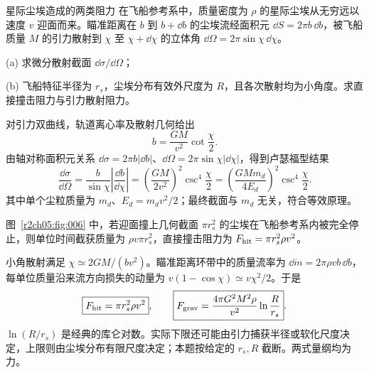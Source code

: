 \begin{practicebox}{星际尘埃造成的两类阻力}
在飞船参考系中，质量密度为 $\rho$ 的星际尘埃从无穷远以速度 $v$ 迎面而来。瞄准距离在 $b$ 到 $b+\dd b$ 的尘埃流经面积元 $\dd S=2\pi b\,\dd b$，被飞船质量 $M$ 的引力散射到 $\chi$ 至 $\chi+\dd\chi$ 的立体角 $\dd\Omega=2\pi\sin\chi\,\dd\chi$。\par
(a) 求微分散射截面 $\dd\sigma/\dd\Omega$；\par
(b) 飞船特征半径为 $r_s$，尘埃分布有效外尺度为 $R$，且各次散射均为小角度。求直接撞击阻力与引力散射阻力。
\label{r2ch05:pr:004}
\begin{solution}
对引力双曲线，轨道离心率及散射几何给出
\[
 b=\frac{GM}{v^2}\cot\frac\chi2.
\]
由轴对称面积元关系 $\dd\sigma=2\pi b|\dd b|$、$\dd\Omega=2\pi\sin\chi|\dd\chi|$，得到卢瑟福型结果
\begin{equation}
 \boxed{\frac{\dd\sigma}{\dd\Omega}
 =\frac{b}{\sin\chi}\left|\frac{\dd b}{\dd\chi}\right|
 =\left(\frac{GM}{2v^2}\right)^2\csc^4\frac\chi2}
 =\left(\frac{GMm_d}{4E_d}\right)^2\csc^4\frac\chi2.
 \label{r2ch05:eq:020}
\end{equation}
其中单个尘粒质量为 $m_d$、$E_d=m_dv^2/2$；最终截面与 $m_d$ 无关，符合等效原理。

图~\ref{r2ch05:fig:006} 中，若迎面撞上几何截面 $\pi r_s^2$ 的尘埃在飞船参考系内被完全停止，则单位时间截获质量为 $\rho v\pi r_s^2$，直接撞击阻力为 $F_{\rm hit}=\pi r_s^2\rho v^2$。

小角散射满足 $\chi\simeq2GM/(bv^2)$。瞄准距离环带中的质量流率为 $\dd\dot m=2\pi\rho vb\,\dd b$，每单位质量沿来流方向损失的动量为 $v(1-\cos\chi)\simeq v\chi^2/2$。于是
\begin{equation}
 \boxed{F_{\rm hit}=\pi r_s^2\rho v^2},\qquad
 \boxed{F_{\rm grav}=\frac{4\pi G^2M^2\rho}{v^2}
 \ln\frac{R}{r_s}}.
 \label{r2ch05:eq:021}
\end{equation}
$\ln(R/r_s)$ 是经典的库仑对数。实际下限还可能由引力捕获半径或软化尺度决定，上限则由尘埃分布有限尺度决定；本题按给定的 $r_s,R$ 截断。两式量纲均为力。
\figGravityScattering
\end{solution}
\end{practicebox}

